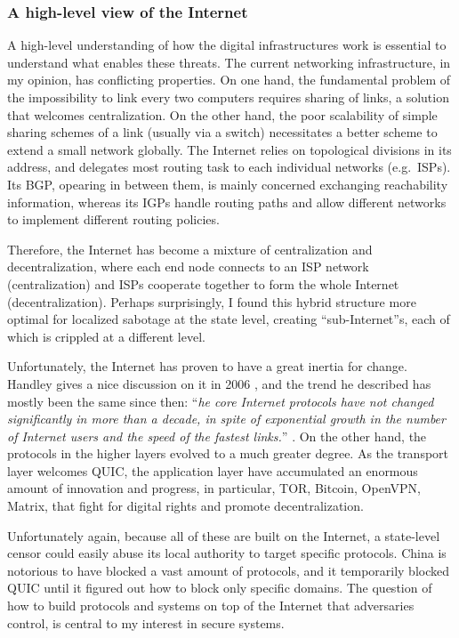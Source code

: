 \documentclass{article}
\begin{document}
\subsubsection{A high-level view of the Internet}
A high-level understanding of how the digital infrastructures work is essential
to understand what enables these threats. The current networking infrastructure,
in my opinion, has conflicting properties. On one hand, the fundamental problem
of the impossibility to link every two computers requires sharing of links, a
solution that welcomes centralization. On the other hand, the poor scalability
of simple sharing schemes of a link (usually via a switch) necessitates a
better scheme to extend a small network globally. The Internet relies on
topological divisions in its address, and delegates most routing task to each
individual networks (e.g.\ ISPs). Its BGP, opearing in between them, is mainly
concerned exchanging reachability information, whereas its IGPs handle
routing paths and allow different networks to implement different routing
policies.

Therefore, the Internet has become a mixture of centralization and
decentralization, where each end node connects to an ISP network
(centralization) and ISPs cooperate together to form the whole Internet
(decentralization). Perhaps surprisingly, I found this hybrid structure 
more optimal for localized sabotage at the state level, creating
``sub-Internet''s, each of which is crippled at a different level. 

Unfortunately, the Internet has proven to have a great inertia for change.
Handley gives a nice discussion on it in 2006 \cite{why.internet.just.works},
and the trend he described has mostly been the same since then: ``\emph{he core
Internet protocols have not changed significantly in more than a decade, in
spite of exponential growth in the number of Internet users and the speed of
the fastest links.}'' \cite{why.internet.just.works}. On the other hand, the
protocols in the higher layers evolved to a much greater degree. As the
transport layer welcomes QUIC\cite{???}, the application layer have accumulated
an enormous amount of innovation and progress, in particular, TOR\cite{???},
Bitcoin\cite{???}, OpenVPN\cite{???}, Matrix\cite{???}, that fight for digital
rights and promote decentralization.

Unfortunately again, because all of these are built on the Internet, a
state-level censor could easily abuse its local authority to target specific
protocols. China is notorious to have blocked a vast amount of protocols, and
it temporarily blocked QUIC until it figured out how to block only specific
domains. The question of how to build protocols and systems on top of the
Internet that adversaries control, is central to my interest in secure
systems.
\end{document}
